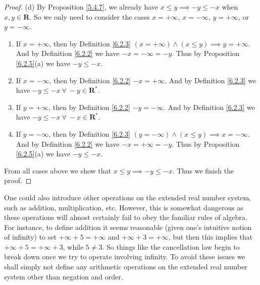 \begin{proof}{(d)}
By Proposition \ref{5.4.7}, we already have \(x \leq y \implies -y \leq -x\) when \(x, y \in \mathbf{R}\).
So we only need to consider the cases \(x = +\infty\), \(x = -\infty\), \(y = +\infty\), or \(y = -\infty\).
\begin{enumerate}[label=(\Roman*)]
    \item If \(x = +\infty\), then by Definition \ref{6.2.3} \((x = +\infty) \land (x \leq y) \implies y = +\infty\).
    And by Definition \ref{6.2.2} we have \(-x = -\infty = -y\).
    Thus by Proposition \ref{6.2.5}(a) we have \(-y \leq -x\).
    \item If \(x = -\infty\), then by Definition \ref{6.2.2} \(-x = +\infty\).
    And by Definition \ref{6.2.3} we have \(-y \leq -x \ \forall\ -y \in \mathbf{R}^*\).
    \item If \(y = +\infty\), then by Definition \ref{6.2.2} \(-y = -\infty\).
    And by Definition \ref{6.2.3} we have \(-y \leq -x \ \forall\ -x \in \mathbf{R}^*\).
    \item If \(y = -\infty\), then by Definition \ref{6.2.3} \((y = -\infty) \land (x \leq y) \implies x = -\infty\).
    And by Definition \ref{6.2.2} we have \(-x = +\infty = -y\).
    Thus by Proposition \ref{6.2.5}(a) we have \(-y \leq -x\).
\end{enumerate}
From all cases above we show that \(x \leq y \implies -y \leq -x\).
Thus we finish the proof.
\end{proof}

\begin{note}
One could also introduce other operations on the extended real number system, such as addition, multiplication, etc.
However, this is somewhat dangerous as these operations will almost certainly fail to obey the familiar rules of algebra.
For instance, to define addition it seems reasonable (given one’s intuitive notion of infinity) to set \(+\infty + 5 = +\infty\) and \(+\infty + 3 = +\infty\), but then this implies that \(+\infty + 5 = +\infty + 3\), while \(5 \neq 3\).
So things like the cancellation law begin to break down once we try to operate involving infinity.
To avoid these issues we shall simply not define any arithmetic operations on the extended real number system other than negation and order.
\end{note}

